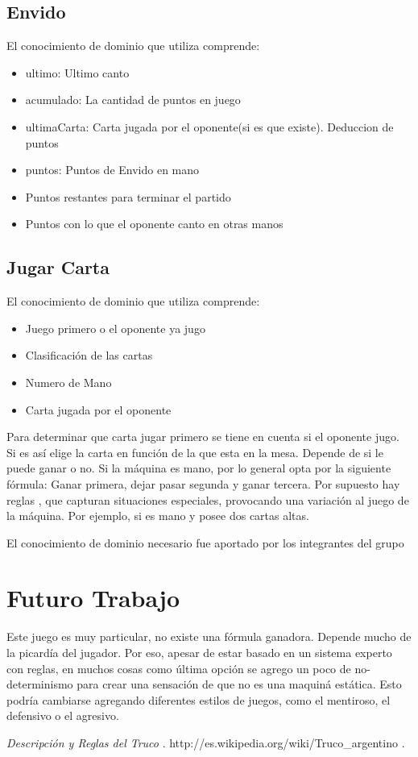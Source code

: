 \documentclass[12pt,a4paper]{article}
\begin{document}
\subsection{Envido}
El conocimiento de dominio que utiliza comprende:
\begin{itemize}
\item ultimo: Ultimo canto 
\item acumulado: La cantidad de puntos en juego
\item ultimaCarta: Carta jugada por el oponente(si es que existe). Deduccion de puntos
\item puntos: Puntos de Envido en mano
\item Puntos restantes para terminar el partido
\item Puntos con lo que el oponente canto en otras manos
\end{itemize}

\subsection{Jugar Carta}
El conocimiento de dominio que utiliza comprende:
\begin{itemize}
\item Juego primero o  el oponente ya jugo
\item Clasificaci\'on de las cartas
\item Numero de Mano
\item Carta jugada por el oponente
\end{itemize}

Para determinar que carta jugar primero se tiene en cuenta si el oponente jugo. Si es as\'i elige la carta en 
funci\'on de la que esta en la mesa. Depende de si le puede ganar o no.
Si la m\'aquina es mano, por lo general opta por la siguiente f\'ormula: Ganar primera, dejar pasar segunda y ganar tercera. 
Por supuesto hay reglas , que capturan situaciones especiales, provocando una variaci\'on al juego de la m\'aquina. Por ejemplo, si es mano y posee dos cartas altas.


El conocimiento de dominio necesario fue aportado por los integrantes del grupo 

\section{Futuro Trabajo}
Este juego es muy particular, no existe una f\'ormula ganadora. Depende mucho de la picard\'ia del jugador. Por eso, apesar de estar basado en un sistema experto
con reglas, en muchos cosas como \'ultima opci\'on se agrego un poco de no-determinismo para crear una sensaci\'on  de que no es una maquin\'a est\'atica. 
Esto podr\'ia cambiarse agregando diferentes estilos de juegos, como el mentiroso, el defensivo o el agresivo.   

\begin{thebibliography}{9}

	 \emph{Descripci\'on y Reglas del Truco }. 
	http://es.wikipedia.org/wiki/Truco\_argentino .

\end{thebibliography}
\end{document}
